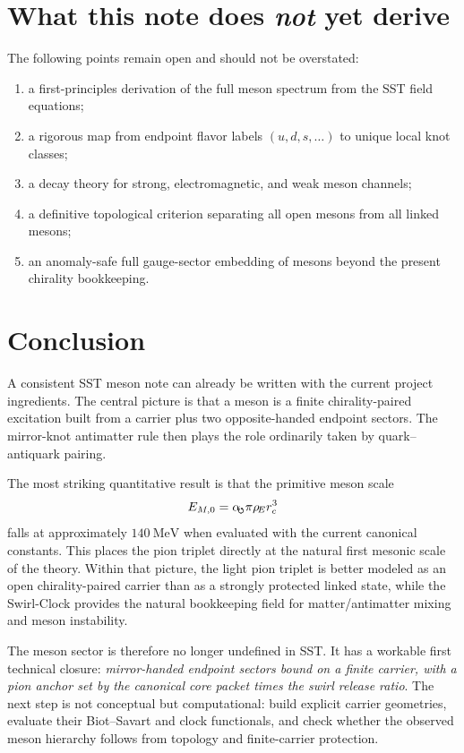 \documentclass[11pt,a4paper]{article}
\newcommand{\swirlarrow}{\mathchoice{\mkern-2mu\scriptstyle\boldsymbol{\circlearrowleft}}{\mkern-2mu\scriptstyle\boldsymbol{\circlearrowleft}}{\mkern-2mu\scriptscriptstyle\boldsymbol{\circlearrowleft}}{\mkern-2mu\scriptscriptstyle\boldsymbol{\circlearrowleft}}}
\newcommand{\rhoE}{\rho_{\!E}}
\newcommand{\rc}{r_c}
\newcommand{\alphasw}{\alpha_{\!\swirlarrow}}
\begin{document}
\section{What this note does \emph{not} yet derive}
The following points remain open and should not be overstated:
\begin{enumerate}[label=(\arabic*)]
    \item a first-principles derivation of the full meson spectrum from the SST field equations;
    \item a rigorous map from endpoint flavor labels \((u,d,s,\ldots)\) to unique local knot classes;
    \item a decay theory for strong, electromagnetic, and weak meson channels;
    \item a definitive topological criterion separating all open mesons from all linked mesons;
    \item an anomaly-safe full gauge-sector embedding of mesons beyond the present chirality bookkeeping.
\end{enumerate}

\section{Conclusion}
A consistent SST meson note can already be written with the current project ingredients. The central picture is that a meson is a finite chirality-paired excitation built from a carrier plus two opposite-handed endpoint sectors. The mirror-knot antimatter rule then plays the role ordinarily taken by quark--antiquark pairing.

The most striking quantitative result is that the primitive meson scale
\[
E_{M,0}=\alphasw\pi\rhoE\rc^{3}
\]
falls at approximately \(140\ \mathrm{MeV}\) when evaluated with the current canonical constants. This places the pion triplet directly at the natural first mesonic scale of the theory. Within that picture, the light pion triplet is better modeled as an open chirality-paired carrier than as a strongly protected linked state, while the Swirl-Clock provides the natural bookkeeping field for matter/antimatter mixing and meson instability.

The meson sector is therefore no longer undefined in SST. It has a workable first technical closure: \emph{mirror-handed endpoint sectors bound on a finite carrier, with a pion anchor set by the canonical core packet times the swirl release ratio}. The next step is not conceptual but computational: build explicit carrier geometries, evaluate their Biot--Savart and clock functionals, and check whether the observed meson hierarchy follows from topology and finite-carrier protection.
\end{document}
